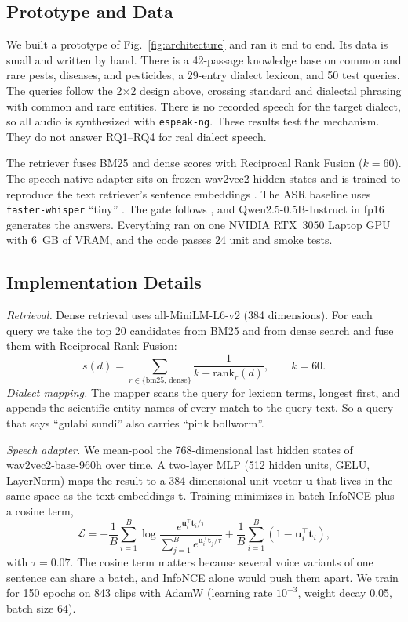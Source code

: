 \documentclass[conference]{IEEEtran}
\begin{document}
\subsection{Prototype and Data}
We built a prototype of Fig.~\ref{fig:architecture} and ran it end to end. Its data is small and written by hand. There is a 42-passage knowledge base on common and rare pests, diseases, and pesticides, a 29-entry dialect lexicon, and 50 test queries. The queries follow the 2$\times$2 design above, crossing standard and dialectal phrasing with common and rare entities. There is no recorded speech for the target dialect, so all audio is synthesized with \texttt{espeak-ng}. These results test the mechanism. They do not answer RQ1--RQ4 for real dialect speech.

The retriever fuses BM25 and dense scores with Reciprocal Rank Fusion ($k{=}60$). The speech-native adapter sits on frozen wav2vec2 hidden states \cite{baevski2020wav2vec} and is trained to reproduce the text retriever's sentence embeddings \cite{min2025speechrag,google2025s2r}. The ASR baseline uses \texttt{faster-whisper} ``tiny'' \cite{radford2023whisper}. The gate follows \cite{dependablerag2026}, and Qwen2.5-0.5B-Instruct in fp16 generates the answers. Everything ran on one NVIDIA RTX~3050 Laptop GPU with 6~GB of VRAM, and the code passes 24 unit and smoke tests.

\subsection{Implementation Details}
\textit{Retrieval.} Dense retrieval uses all-MiniLM-L6-v2 (384 dimensions). For each query we take the top 20 candidates from BM25 and from dense search and fuse them with Reciprocal Rank Fusion:
\begin{equation}
s(d) = \sum_{r \in \{\mathrm{bm25},\,\mathrm{dense}\}} \frac{1}{k + \mathrm{rank}_r(d)}, \qquad k = 60.
\end{equation}
\textit{Dialect mapping.} The mapper scans the query for lexicon terms, longest first, and appends the scientific entity names of every match to the query text. So a query that says ``gulabi sundi'' also carries ``pink bollworm''.

\textit{Speech adapter.} We mean-pool the 768-dimensional last hidden states of wav2vec2-base-960h over time. A two-layer MLP (512 hidden units, GELU, LayerNorm) maps the result to a 384-dimensional unit vector $\mathbf{u}$ that lives in the same space as the text embeddings $\mathbf{t}$. Training minimizes in-batch InfoNCE plus a cosine term,
\begin{equation}
\mathcal{L} = -\frac{1}{B}\sum_{i=1}^{B} \log \frac{e^{\mathbf{u}_i^\top \mathbf{t}_i/\tau}}{\sum_{j=1}^{B} e^{\mathbf{u}_i^\top \mathbf{t}_j/\tau}} + \frac{1}{B}\sum_{i=1}^{B} \left(1 - \mathbf{u}_i^\top \mathbf{t}_i\right),
\end{equation}
with $\tau = 0.07$. The cosine term matters because several voice variants of one sentence can share a batch, and InfoNCE alone would push them apart. We train for 150 epochs on 843 clips with AdamW (learning rate $10^{-3}$, weight decay 0.05, batch size 64).
\end{document}
